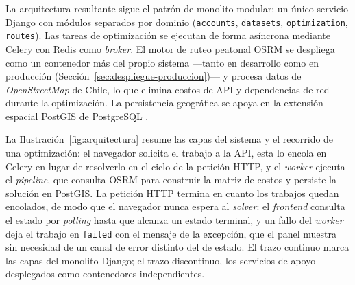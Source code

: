 La arquitectura resultante sigue el patrón de monolito modular: un único servicio Django
\citep{django} con módulos separados por dominio (\texttt{accounts}, \texttt{datasets},
\texttt{optimization}, \texttt{routes}). Las tareas de optimización se ejecutan de forma asíncrona
mediante Celery \citep{celery} con Redis como \textit{broker}. El motor de ruteo peatonal OSRM
\citep{osrm} se despliega como un contenedor más del propio sistema ---tanto en desarrollo como en
producción (Sección~\ref{sec:despliegue-produccion})--- y procesa datos de \textit{OpenStreetMap}
\citep{openstreetmap} de Chile, lo que elimina costos de API y dependencias de red durante la
optimización. La persistencia geográfica se apoya en la extensión espacial PostGIS de PostgreSQL
\citep{postgis}.

La Ilustración~\ref{fig:arquitectura} resume las capas del sistema y el recorrido de una
optimización: el navegador solicita el trabajo a la API, esta lo encola en Celery en lugar de
resolverlo en el ciclo de la petición HTTP, y el \textit{worker} ejecuta el \textit{pipeline}, que
consulta OSRM para construir la matriz de costos y persiste la solución en PostGIS. La petición
HTTP termina en cuanto los trabajos quedan encolados, de modo que el navegador nunca espera al
\textit{solver}: el \textit{frontend} consulta el estado por \textit{polling} hasta que alcanza un
estado terminal, y un fallo del \textit{worker} deja el trabajo en \texttt{failed} con el mensaje
de la excepción, que el panel muestra sin necesidad de un canal de error distinto del de estado. El
trazo continuo marca las capas del monolito Django; el trazo discontinuo, los servicios
de apoyo desplegados como contenedores independientes.

